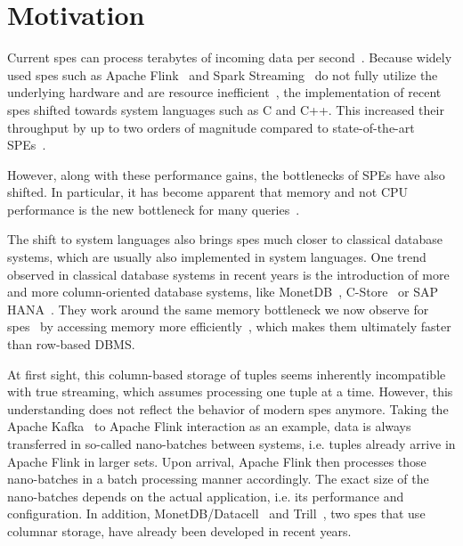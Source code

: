 \section{Motivation}
\label{sec:motivation}

Current \acp{spe} can process terabytes of incoming data per second~\cite[]{alibaba}.
Because widely used \acp{spe} such as Apache Flink~\cite{DBLP:journals/debu/CarboneKEMHT15} and Spark Streaming~\cite{DBLP:journals/cacm/ZahariaXWDADMRV16} do not fully utilize the underlying hardware and are resource inefficient~\cite[]{DBLP:conf/icde/ZhangHDZH17,DBLP:journals/pvldb/ZeuchBRMKLRTM19}, the implementation of recent \acp{spe} shifted towards system languages such as C and C++. 
This increased their throughput by up to two orders of magnitude compared to state-of-the-art SPEs~\cite[]{DBLP:journals/pvldb/ZeuchBRMKLRTM19}.

However, along with these performance gains, the bottlenecks of SPEs have also shifted.
In particular, it has become apparent that memory and not CPU performance is the new bottleneck for many queries~\cite[]{bollmeier2021processor}.

The shift to system languages also brings \acp{spe} much closer to classical database systems, which are usually also implemented in system languages.
One trend observed in classical database systems in recent years is the introduction of more and more column-oriented database systems, like MonetDB~\cite[]{DBLP:journals/debu/IdreosGNMMK12,DBLP:conf/cidr/BonczZN05,DBLP:journals/vldb/BonczK99}, C-Store~\cite[]{DBLP:conf/vldb/StonebrakerABCCFLLMOORTZ05} or SAP HANA~\cite[]{DBLP:conf/sigmod/SikkaFLCPB12}.
They work around the same memory bottleneck we now observe for \acp{spe}~\cite[]{DBLP:conf/vldb/BonczMK99} by accessing memory more efficiently~\cite[]{DBLP:conf/sigmod/AbadiMH08}, which makes them ultimately faster than row-based DBMS.

At first sight, this column-based storage of tuples seems inherently incompatible with true streaming, which assumes processing one tuple at a time.
However, this understanding does not reflect the behavior of modern \acp{spe} anymore.
Taking the Apache Kafka~\cite{Kreps2011KafkaA} to Apache Flink interaction as an example, data is always transferred in so-called nano-batches between systems, i.e. tuples already arrive in Apache Flink in larger sets.
Upon arrival, Apache Flink then processes those nano-batches in a batch processing manner accordingly.
The exact size of the nano-batches depends on the actual application, i.e. its performance and configuration.
In addition, MonetDB/Datacell~\cite[]{DBLP:journals/pvldb/LiarouIMK12} and Trill~\cite[]{DBLP:journals/pvldb/ChandramouliGBDPTW14}, two \acp{spe} that use columnar storage, have already been developed in recent years.

